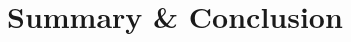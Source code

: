 \documentclass[a4paper,11pt]{article}
\begin{document}
\section{Summary \& Conclusion}






\small
\end{document}
